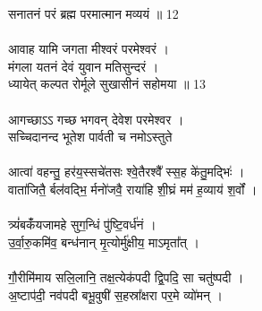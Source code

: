 सनातनं परं ब्रह्म परमात्मान मव्ययं ॥ 12\\
\\
आवाह यामि जगता मीश्वरं परमेश्वरं ।\\
मंगला यतनं देवं युवान मतिसुन्दरं ।\\
ध्यायेत् कल्पत रोर्मूले सुखासीनं सहोमया ॥ 13\\
\\
आगच्छाऽऽ गच्छ भगवन् देवेश परमेश्वर ।\\
सच्चिदानन्द भूतेश पार्वती च नमोऽस्तुते\\
\\
आत्वा॑ वहन्तु॒ हर॑य॒स्सचे॑तसः श्वे॒तैरश्वै᳚ स्स॒ह के॑तु॒मद्भिः॑ ।\\
वाता॑जितै॒ र्बल॑वद्भि॒ र्मनो॑जवै॒ राया॑हि शी॒घ्रं मम॑ ह॒व्याय॑ श॒र्वों ।\\
\\
त्र्यं॑बकंँयजामहे सुग॒न्धिं पु॑ष्टि॒वर्ध॑नं ।\\
उ॒र्वा॒रु॒कमि॑व॒ बन्ध॑नान् मृ॒त्योर्मु॑क्षीय॒ माऽमृता᳚त् ।\\
\\
गौ॒रीमि॑माय सलि॒लानि॒ तक्ष॒त्येक॑पदी द्वि॒पदि॒ सा चतु॑ष्पदी ।\\
अ॒ष्टाप॑दी॒ नव॑पदी बभू॒वुषी॑ स॒हस्रा᳚क्षरा पर॒मे व्यो॑मन् ।\\